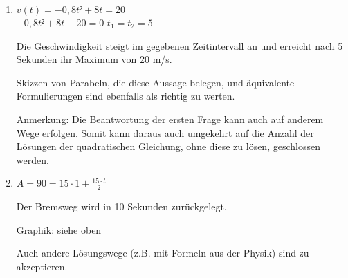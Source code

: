 \begin{langesbeispiel}
{\begin{enumerate}
	Die Beschleunigung 3 Sekunden nach dem Beginn der Bewegung beträgt 3,2\,m/$\text{s}²$.
	
Anmerkung: Der Zeitpunkt und der Begriff "`Beschleunigung"' müssen angegeben werden.

Die Beschleunigung nimmt pro Sekunde um 1,6\,m/$\text{s}²$ ab.

Anmerkung: Die Einheit m/$\text{s}²$ muss angegeben werden.

\item $v(t)=-0,8t²+8t=20$\\
$-0,8t²+8t-20=0$ \hspace*{1cm} $t_1=t_2=5$

Die Geschwindigkeit steigt im gegebenen Zeitintervall an und erreicht nach 5 Sekunden ihr Maximum von 20 m/s.

Skizzen von Parabeln, die diese Aussage belegen, und äquivalente Formulierungen sind ebenfalls
als richtig zu werten.

Anmerkung: Die Beantwortung der ersten Frage kann auch auf anderem Wege erfolgen. Somit
kann daraus auch umgekehrt auf die Anzahl der Lösungen der quadratischen Gleichung, ohne diese zu lösen, geschlossen werden.

\item $A=90=15\cdot 1+\frac{15\cdot t}{2}$

Der Bremsweg wird in 10 Sekunden zurückgelegt.

Graphik: siehe oben

Auch andere Lösungswege (z.B. mit Formeln aus der Physik) sind zu akzeptieren.
			\end{enumerate}}
		\end{langesbeispiel}